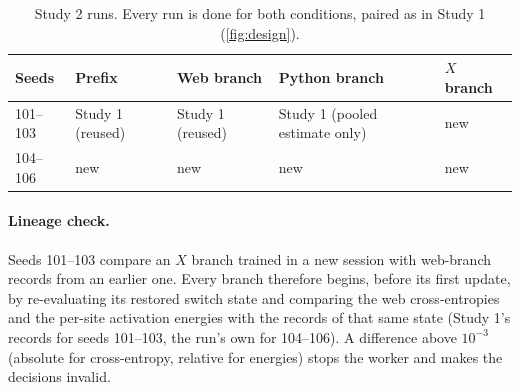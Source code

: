 \documentclass[11pt]{article}
\begin{document}
\begin{table}[t]
\centering
\small
\caption{Study 2 runs. Every run is done for both conditions, paired as in Study 1 (\cref{fig:design}).}
\label{tab:s2runs}
\begin{tabular}{@{}lllll@{}}
\toprule
Seeds & Prefix & Web branch & Python branch & $X$ branch \\
\midrule
101--103 & Study 1 (reused) & Study 1 (reused) & Study 1 (pooled estimate only) & new \\
104--106 & new & new & new & new \\
\bottomrule
\end{tabular}
\end{table}

\paragraph{Lineage check.} Seeds 101--103 compare an $X$ branch trained in a new session with web-branch records
from an earlier one. Every branch therefore begins, before its first update, by re-evaluating its restored switch
state and comparing the web cross-entropies and the per-site activation energies with the records of that same
state (Study 1's records for seeds 101--103, the run's own for 104--106). A difference above $10^{-3}$ (absolute
for cross-entropy, relative for energies) stops the worker and makes the decisions invalid.
\end{document}
